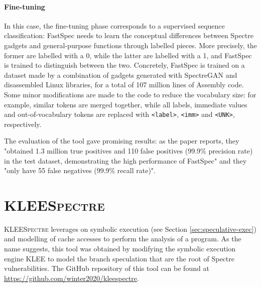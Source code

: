 \documentclass[12pt,a4paper]{book}
\theoremstyle{definition}
\begin{document}
	\paragraph{Fine-tuning} In this case, the fine-tuning phase corresponds to a supervised sequence classification: FastSpec needs to learn the conceptual differences between Spectre gadgets and general-purpose functions through labelled pieces. More precisely, the former are labelled with a 0, while the latter are labelled with a 1, and FastSpec is trained to distinguish between the two. Concretely, FastSpec is trained on a dataset made by a combination of gadgets generated with SpectreGAN and disassembled Linux libraries, for a total of 107 million lines of Assembly code. Some minor modifications are made to the code to reduce the vocabulary size: for example, similar tokens are merged together, while all labels, immediate values and out-of-vocabulary tokens are replaced with \texttt{<label>}, \texttt{<imm>} and \texttt{<UNK>}, respectively.
	
	The evaluation of the tool gave promising results: as the paper reports, they "obtained 1.3 million true positives and 110 false positives (99.9\% precision rate) in the test dataset, demonstrating the high performance of FastSpec" and they "only have 55 false negatives (99.9\% recall rate)".
	
	\section{\textsc{KLEESpectre}}\label{sec:kleespectre}
	\textsc{KLEESpectre} \cite{Wang2019} leverages on symbolic execution (see Section \ref{sec:speculative-exec}) and modelling of cache accesses to perform the analysis of a program. As the name suggests, this tool was obtained by modifying the symbolic execution engine KLEE \cite{Cadar2008} to model the branch speculation that are the root of Spectre vulnerabilities. The GitHub repository of this tool can be found at \url{https://github.com/winter2020/kleespectre}.
\end{document}
